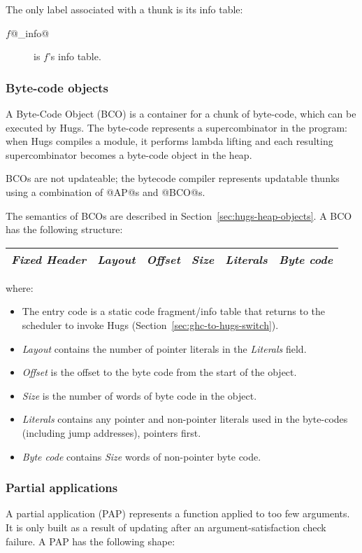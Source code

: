 \documentclass[11pt]{article}
\newcommand{\secref}[1]{Section~\ref{sec:#1}}
\newcommand{\Subsubsection}[2]{\subsubsection{#1}\label{sec:#2}}
\begin{document}
The only label associated with a thunk is its info table:

\begin{description}
\item[$f$@\_info@] is $f$'s info table.
\end{description}


\Subsubsection{Byte-code objects}{BCO}

A Byte-Code Object (BCO) is a container for a chunk of byte-code,
which can be executed by Hugs.  The byte-code represents a
supercombinator in the program: when Hugs compiles a module, it
performs lambda lifting and each resulting supercombinator becomes a
byte-code object in the heap.

BCOs are not updateable; the bytecode compiler represents updatable
thunks using a combination of @AP@s and @BCO@s.

The semantics of BCOs are described in \secref{hugs-heap-objects}.  A
BCO has the following structure:

\begin{center}
\begin{tabular}{|l|l|l|l|l|l|}
\hline 
\emph{Fixed Header} & \emph{Layout} & \emph{Offset} & \emph{Size} &
\emph{Literals} & \emph{Byte code} \\
\hline
\end{tabular}
\end{center}

\noindent where:
\begin{itemize}
\item The entry code is a static code fragment/info table that returns
to the scheduler to invoke Hugs (\secref{ghc-to-hugs-switch}).
\item \emph{Layout} contains the number of pointer literals in the
\emph{Literals} field.
\item \emph{Offset} is the offset to the byte code from the start of
the object.
\item \emph{Size} is the number of words of byte code in the object.
\item \emph{Literals} contains any pointer and non-pointer literals used in
the byte-codes (including jump addresses), pointers first.
\item \emph{Byte code} contains \emph{Size} words of non-pointer byte
code.
\end{itemize}


\Subsubsection{Partial applications}{PAP}

A partial application (PAP) represents a function applied to too few
arguments.  It is only built as a result of updating after an
argument-satisfaction check failure.  A PAP has the following shape:
\end{document}
